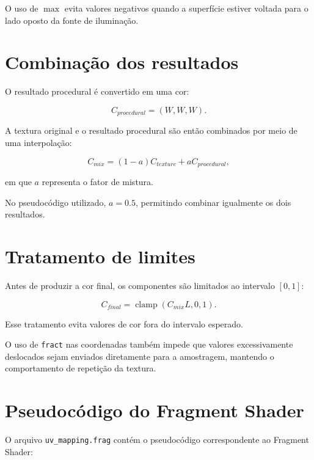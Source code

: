 O uso de $\max$ evita valores negativos quando a superfície estiver voltada
para o lado oposto da fonte de iluminação.


\section{Combinação dos resultados}

O resultado procedural é convertido em uma cor:

\begin{equation}
C_{procedural}=
(W,W,W).
\end{equation}

A textura original e o resultado procedural são então combinados por meio
de uma interpolação:

\begin{equation}
C_{mix}=
(1-a)C_{texture}+aC_{procedural},
\end{equation}

em que $a$ representa o fator de mistura.

No pseudocódigo utilizado, $a=0.5$, permitindo combinar igualmente os dois
resultados.


\section{Tratamento de limites}

Antes de produzir a cor final, os componentes são limitados ao intervalo
$[0,1]$:

\begin{equation}
C_{final}=\operatorname{clamp}(C_{mix}L,0,1).
\end{equation}

Esse tratamento evita valores de cor fora do intervalo esperado.

O uso de \texttt{fract} nas coordenadas também impede que valores
excessivamente deslocados sejam enviados diretamente para a amostragem,
mantendo o comportamento de repetição da textura.


\section{Pseudocódigo do Fragment Shader}

O arquivo \texttt{uv\_mapping.frag} contém o pseudocódigo correspondente ao
Fragment Shader:

